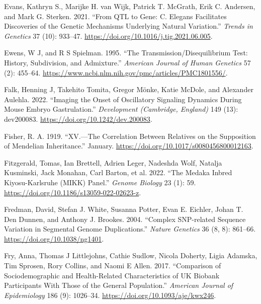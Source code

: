 \documentclass[
]{book}
\newlength{\cslhangindent}
\newlength{\cslentryspacingunit} %
\newenvironment{CSLReferences}[2] %
 {%
  \setlength{\parindent}{0pt}
  \ifodd #1
  \let\oldpar\par
  \def\par{\hangindent=\cslhangindent\oldpar}
  \fi
  \setlength{\parskip}{#2\cslentryspacingunit}
 }%
 {}
\begin{document}
\begin{CSLReferences}{1}{0}
\leavevmode{}%
Evans, Kathryn S., Marijke H. van Wijk, Patrick T. McGrath, Erik C. Andersen, and Mark G. Sterken. 2021. {``From {QTL} to Gene: {C}. Elegans Facilitates Discoveries of the Genetic Mechanisms Underlying Natural Variation.''} \emph{Trends in Genetics} 37 (10): 933--47. \url{https://doi.org/10.1016/j.tig.2021.06.005}.

\leavevmode{}%
Ewens, W J, and R S Spielman. 1995. {``The Transmission/Disequilibrium Test: History, Subdivision, and Admixture.''} \emph{American Journal of Human Genetics} 57 (2): 455--64. \url{https://www.ncbi.nlm.nih.gov/pmc/articles/PMC1801556/}.

\leavevmode{}%
Falk, Henning J, Takehito Tomita, Gregor Mönke, Katie McDole, and Alexander Aulehla. 2022. {``Imaging the Onset of Oscillatory Signaling Dynamics During Mouse Embryo Gastrulation.''} \emph{Development (Cambridge, England)} 149 (13): dev200083. \url{https://doi.org/10.1242/dev.200083}.

\leavevmode{}%
Fisher, R. A. 1919. {``{XV}.---{The Correlation} Between {Relatives} on the {Supposition} of {Mendelian Inheritance}.''} January. \url{https://doi.org/10.1017/s0080456800012163}.

\leavevmode{}%
Fitzgerald, Tomas, Ian Brettell, Adrien Leger, Nadeshda Wolf, Natalja Kusminski, Jack Monahan, Carl Barton, et al. 2022. {``The {Medaka Inbred Kiyosu-Karlsruhe} ({MIKK}) Panel.''} \emph{Genome Biology} 23 (1): 59. \url{https://doi.org/10.1186/s13059-022-02623-z}.

\leavevmode{}%
Fredman, David, Stefan J. White, Susanna Potter, Evan E. Eichler, Johan T. Den Dunnen, and Anthony J. Brookes. 2004. {``Complex {SNP-related} Sequence Variation in Segmental Genome Duplications.''} \emph{Nature Genetics} 36 (8, 8): 861--66. \url{https://doi.org/10.1038/ng1401}.

\leavevmode{}%
Fry, Anna, Thomas J Littlejohns, Cathie Sudlow, Nicola Doherty, Ligia Adamska, Tim Sprosen, Rory Collins, and Naomi E Allen. 2017. {``Comparison of {Sociodemographic} and {Health-Related Characteristics} of {UK Biobank Participants With Those} of the {General Population}.''} \emph{American Journal of Epidemiology} 186 (9): 1026--34. \url{https://doi.org/10.1093/aje/kwx246}.


\end{CSLReferences}
\end{document}
